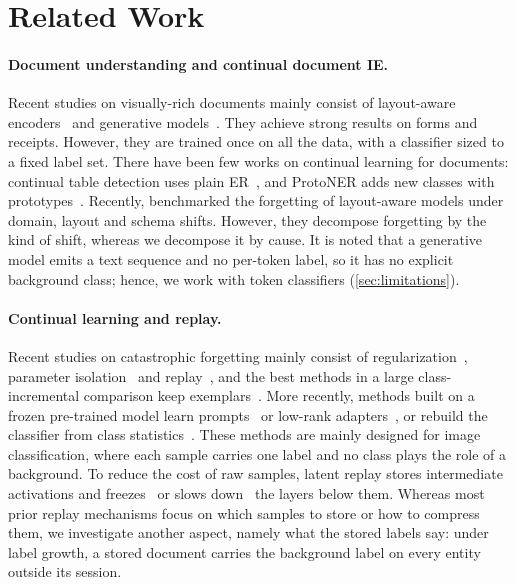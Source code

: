 \documentclass[10pt,twocolumn,letterpaper]{article}
\begin{document}
\section{Related Work}
\label{sec:related}
\paragraph{Document understanding and continual document IE.} Recent studies on visually-rich documents mainly consist of layout-aware encoders~\citep{xu2020layoutlm,xu2021layoutlmv2,huang2022layoutlmv3,wang2022lilt,hong2022bros} and generative models~\citep{kim2022donut,tang2023udop}. They achieve strong results on forms and receipts. However, they are trained once on all the data, with a classifier sized to a fixed label set. There have been few works on continual learning for documents: continual table detection uses plain ER~\citep{minouei2022table}, and ProtoNER adds new classes with prototypes~\citep{kumar2023protoner}. Recently, \citet{sassioui2026documents} benchmarked the forgetting of layout-aware models under domain, layout and schema shifts. However, they decompose forgetting by the kind of shift, whereas we decompose it by cause. It is noted that a generative model emits a text sequence and no per-token label, so it has no explicit background class; hence, we work with token classifiers (\cref{sec:limitations}).

\paragraph{Continual learning and replay.} Recent studies on catastrophic forgetting mainly consist of regularization~\citep{kirkpatrick2017ewc,li2017lwf}, parameter isolation~\citep{mallya2018packnet,rusu2016pnn} and replay~\citep{rolnick2019er,buzzega2020der}, and the best methods in a large class-incremental comparison keep exemplars~\citep{masana2022class}. More recently, methods built on a frozen pre-trained model learn prompts~\citep{wang2022l2p,smith2023coda} or low-rank adapters~\citep{liang2024inflora,he2025cllora}, or rebuild the classifier from class statistics~\citep{zhang2023slca,mcdonnell2023ranpac}. These methods are mainly designed for image classification, where each sample carries one label and no class plays the role of a background. To reduce the cost of raw samples, latent replay stores intermediate activations and freezes~\citep{hayes2020remind} or slows down~\citep{pellegrini2020latent} the layers below them. Whereas most prior replay mechanisms focus on which samples to store or how to compress them, we investigate another aspect, namely what the stored labels say: under label growth, a stored document carries the background label on every entity outside its session.
\end{document}
